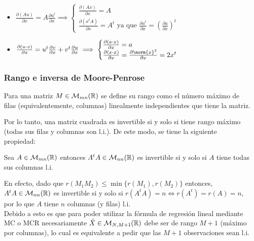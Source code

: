\begin{itemize}
	\item $\frac{\partial (Au)}{\partial x} = A\frac{\partial u^t}{\partial x} \implies \begin{cases}
		\frac{\partial (Ax)}{\partial x}=A\\
		\frac{\partial (x^tA)}{\partial x} = A^t \text{ ya que } \frac{\partial u^t}{\partial x} = \left( \frac{\partial u}{\partial x}\right)^t
	\end{cases}$
	
	\item $\frac{\partial (u\cdot v)}{\partial x} = u^t\frac{\partial v}{\partial x} + v^t \frac{\partial u}{\partial x} \implies \begin{cases}
 	\frac{\partial (a\cdot x)}{\partial x} = a\\
 	\frac{\partial (x\cdot x)}{\partial x} = \frac{\partial \norm{x}^2}{\partial x} = 2x^t
 \end{cases}
$ 
\end{itemize}


\subsubsection{Rango e inversa de Moore-Penrose}

\begin{definition}[rango]
	Para una matriz $M\in\mathcal{M}_{mn}({\mathbb R})$ se define su rango como el número máximo de filas (equivalentemente, columnas) linealmente independientes que tiene la matriz.
\end{definition}

Por lo tanto, una matriz cuadrada es invertible si y solo si tiene rango máximo (todas sus filas y columnas son l.i.). De este modo, se tiene la siguiente propiedad:

\begin{lemma}
	Sea $A\in\mathcal{M}_{mn}({\mathbb R})$ entonces $A^tA \in\mathcal{M}_{nn}({\mathbb R})$ es invertible si y solo si $A$ tiene todas sus columnas l.i.
\end{lemma}

En efecto, dado que $r(M_1M_2)\leq\min\{r(M_1),r(M_2)\}$ entonces, $A^tA \in\mathcal{M}_{nn}({\mathbb R})$ es invertible si y solo si $r(A^tA)=n\iff r(A^t)=r(A)=n$, por lo que $A$ tiene $n$ columnas (y filas) l.i.\\

Debido a esto es que para poder utilizar la fórmula de regresión lineal mediante MC o MCR necesariamente $\hat{X} \in\mathcal{M}_{N,M+1}({\mathbb R})$ debe ser de rango $M+1$ (máximo por columnas), lo cual es equivalente a pedir que las $M+1$ observaciones sean l.i.\\

